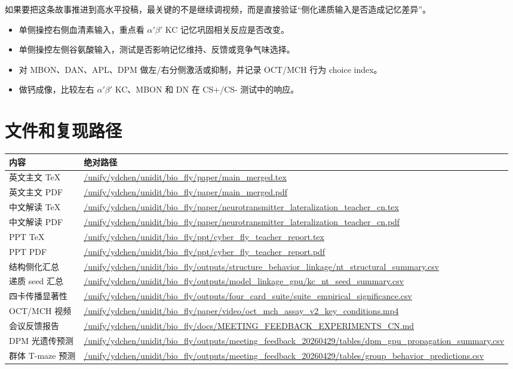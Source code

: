 \documentclass[11pt,fontset=none]{ctexart}
\begin{document}
如果要把这条故事推进到高水平投稿，最关键的不是继续调视频，而是直接验证“侧化递质输入是否造成记忆差异”。

\begin{itemize}
  \item 单侧操控右侧血清素输入，重点看 $\alpha'\beta'$ KC 记忆巩固相关反应是否改变。
  \item 单侧操控左侧谷氨酸输入，测试是否影响记忆维持、反馈或竞争气味选择。
  \item 对 MBON、DAN、APL、DPM 做左/右分侧激活或抑制，并记录 OCT/MCH 行为 choice index。
  \item 做钙成像，比较左右 $\alpha'\beta'$ KC、MBON 和 DN 在 CS+/CS- 测试中的响应。
\end{itemize}

\section*{文件和复现路径}

\scriptsize
\begin{tabularx}{\linewidth}{@{}p{3.0cm}X@{}}
\toprule
\textbf{内容} & \textbf{绝对路径} \\
\midrule
英文主文 TeX & \url{/unify/ydchen/unidit/bio_fly/paper/main_merged.tex} \\
英文主文 PDF & \url{/unify/ydchen/unidit/bio_fly/paper/main_merged.pdf} \\
中文解读 TeX & \url{/unify/ydchen/unidit/bio_fly/paper/neurotransmitter_lateralization_teacher_cn.tex} \\
中文解读 PDF & \url{/unify/ydchen/unidit/bio_fly/paper/neurotransmitter_lateralization_teacher_cn.pdf} \\
PPT TeX & \url{/unify/ydchen/unidit/bio_fly/ppt/cyber_fly_teacher_report.tex} \\
PPT PDF & \url{/unify/ydchen/unidit/bio_fly/ppt/cyber_fly_teacher_report.pdf} \\
结构侧化汇总 & \url{/unify/ydchen/unidit/bio_fly/outputs/structure_behavior_linkage/nt_structural_summary.csv} \\
递质 seed 汇总 & \url{/unify/ydchen/unidit/bio_fly/outputs/model_linkage_gpu/kc_nt_seed_summary.csv} \\
四卡传播显著性 & \url{/unify/ydchen/unidit/bio_fly/outputs/four_card_suite/suite_empirical_significance.csv} \\
OCT/MCH 视频 & \url{/unify/ydchen/unidit/bio_fly/paper/video/oct_mch_assay_v2_key_conditions.mp4} \\
会议反馈报告 & \url{/unify/ydchen/unidit/bio_fly/docs/MEETING_FEEDBACK_EXPERIMENTS_CN.md} \\
DPM 光遗传预测 & \url{/unify/ydchen/unidit/bio_fly/outputs/meeting_feedback_20260429/tables/dpm_gpu_propagation_summary.csv} \\
群体 T-maze 预测 & \url{/unify/ydchen/unidit/bio_fly/outputs/meeting_feedback_20260429/tables/group_behavior_predictions.csv} \\
\bottomrule
\end{tabularx}
\normalsize
\end{document}
